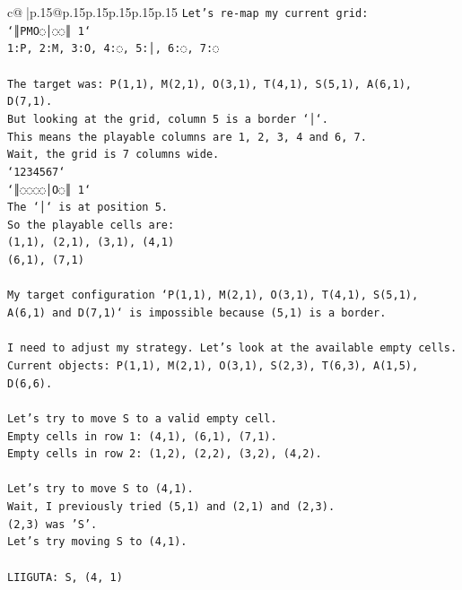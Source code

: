\documentclass{article}
\begin{document}
{\begin{supertabular}{c@{$\;$}|p{.15\linewidth}@{}p{.15\linewidth}p{.15\linewidth}p{.15\linewidth}p{.15\linewidth}p{.15\linewidth}}
{{{\texttt{Let's re{-}map my current grid:} \\
\texttt{`║PMO◌│◌◌║ 1`} \\
\texttt{1:P, 2:M, 3:O, 4:◌, 5:│, 6:◌, 7:◌} \\
\\ 
\texttt{The target was: P(1,1), M(2,1), O(3,1), T(4,1), S(5,1), A(6,1), D(7,1).} \\
\texttt{But looking at the grid, column 5 is a border `│`.} \\
\texttt{This means the playable columns are 1, 2, 3, 4 and 6, 7.} \\
\texttt{Wait, the grid is 7 columns wide.} \\
\texttt{`1234567`} \\
\texttt{`║◌◌◌◌│O◌║ 1`} \\
\texttt{The `│` is at position 5.} \\
\texttt{So the playable cells are:} \\
\texttt{(1,1), (2,1), (3,1), (4,1)} \\
\texttt{(6,1), (7,1)} \\
\\ 
\texttt{My target configuration `P(1,1), M(2,1), O(3,1), T(4,1), S(5,1), A(6,1) and D(7,1)` is impossible because (5,1) is a border.} \\
\\ 
\texttt{I need to adjust my strategy. Let's look at the available empty cells.} \\
\texttt{Current objects: P(1,1), M(2,1), O(3,1), S(2,3), T(6,3), A(1,5), D(6,6).} \\
\\ 
\texttt{Let's try to move S to a valid empty cell.} \\
\texttt{Empty cells in row 1: (4,1), (6,1), (7,1).} \\
\texttt{Empty cells in row 2: (1,2), (2,2), (3,2), (4,2).} \\
\\ 
\texttt{Let's try to move S to (4,1).} \\
\texttt{Wait, I previously tried (5,1) and (2,1) and (2,3).} \\
\texttt{(2,3) was 'S'.} \\
\texttt{Let's try moving S to (4,1).} \\
\\ 
\texttt{LIIGUTA: S, (4, 1)} \\
            }
        }
    }
     \\ \\


\end{supertabular}}
\end{document}
